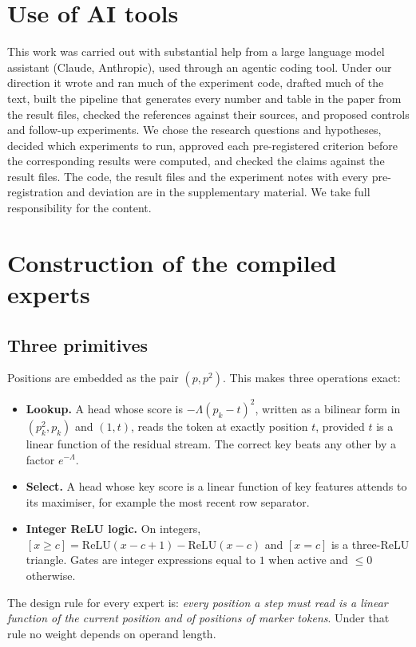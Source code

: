 \documentclass[10pt]{article}
\begin{document}
\section*{Use of AI tools}
This work was carried out with substantial help from a large language model assistant (Claude,
Anthropic), used through an agentic coding tool. Under our direction it wrote and ran much of
the experiment code, drafted much of the text, built the pipeline that generates every number
and table in the paper from the result files, checked the references against their sources,
and proposed controls and follow-up experiments. We chose the research questions and
hypotheses, decided which experiments to run, approved each pre-registered criterion before
the corresponding results were computed, and checked the claims against the result files. The
code, the result files and the experiment notes with every pre-registration and deviation are
in the supplementary material. We take full responsibility for the content.




\appendix
\section{Construction of the compiled experts}
\label{app:construction}

\subsection{Three primitives}
\label{sec:primitives}
Positions are embedded as the pair $(p, p^2)$. This makes three operations exact:
\begin{itemize}
\item \textbf{Lookup.} A head whose score is $-\Lambda (p_k - t)^2$, written as a bilinear form in
$(p_k^2, p_k)$ and $(1, t)$, reads the token at exactly position $t$, provided $t$ is a linear
function of the residual stream. The correct key beats any other by a factor $e^{-\Lambda}$.
\item \textbf{Select.} A head whose key score is a linear function of key features attends to its
maximiser, for example the most recent row separator.
\item \textbf{Integer ReLU logic.} On integers, $[x\ge c] = \mathrm{ReLU}(x-c+1)-\mathrm{ReLU}(x-c)$
and $[x = c]$ is a three-ReLU triangle. Gates are integer expressions equal to $1$ when active and
$\le 0$ otherwise.
\end{itemize}
The design rule for every expert is: \emph{every position a step must read is a linear function
of the current position and of positions of marker tokens}. Under that rule no weight depends on
operand length.
\end{document}
